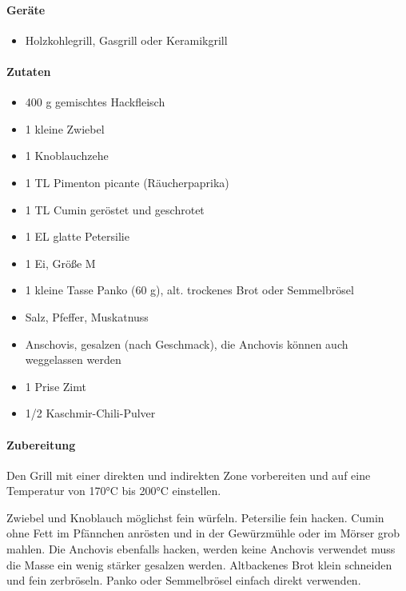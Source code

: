 \paragraph{Geräte}

\begin{itemize}[noitemsep]
	\item Holzkohlegrill, Gasgrill oder Keramikgrill
\end{itemize}

\paragraph{Zutaten}

\begin{itemize}[noitemsep]
	\item 400 g gemischtes Hackfleisch
	\item 1 kleine Zwiebel
	\item 1 Knoblauchzehe
	\item 1 TL Pimenton picante (Räucherpaprika)
	\item 1 TL Cumin geröstet und geschrotet
	\item 1 EL glatte Petersilie
	\item 1 Ei, Größe M
	\item 1 kleine Tasse Panko (60 g), alt. trockenes Brot oder Semmelbrösel
	\item Salz, Pfeffer, Muskatnuss
	\item  Anschovis, gesalzen (nach Geschmack), die Anchovis können auch weggelassen werden
	\item 1 Prise Zimt
	\item 1/2 Kaschmir-Chili-Pulver
\end{itemize}

\paragraph{Zubereitung}

Den Grill mit einer direkten und indirekten Zone vorbereiten und auf eine Temperatur von 170°C bis 200°C einstellen.

Zwiebel und Knoblauch möglichst fein würfeln. Petersilie fein hacken. Cumin ohne Fett im Pfännchen anrösten und in der Gewürzmühle 
oder im Mörser grob mahlen. Die Anchovis ebenfalls hacken, werden keine Anchovis verwendet muss die Masse ein wenig stärker 
gesalzen werden. Altbackenes Brot klein schneiden und fein zerbröseln. Panko oder Semmelbrösel einfach direkt verwenden.

